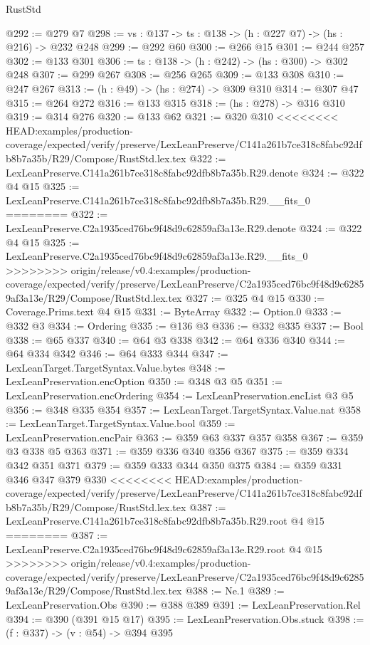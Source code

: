 \begin{lexlean}{RustStd}
\begin{coremodule}
{\begin{coremodule}
@292 := @279 @7
@298 := {vs : @137} -> {ts : @138} -> (h : @227 @7) -> (hs : @216) -> @232 @248
@299 := @292 @60
@300 := @266 @15
@301 := @244 @257
@302 := @133 @301
@306 := {ts : @138} -> (h : @242) -> (hs : @300) -> @302 @248
@307 := @299 @267
@308 := @256 @265
@309 := @133 @308
@310 := @247 @267
@313 := (h : @49) -> (hs : @274) -> @309 @310
@314 := @307 @47
@315 := @264 @272
@316 := @133 @315
@318 := (hs : @278) -> @316 @310
@319 := @314 @276
@320 := @133 @62
@321 := @320 @310
<<<<<<<< HEAD:examples/production-coverage/expected/verify/preserve/LexLeanPreserve/C141a261b7ce318c8fabc92dfb8b7a35b/R29/Compose/RustStd.lex.tex
@322 := LexLeanPreserve.C141a261b7ce318c8fabc92dfb8b7a35b.R29.denote
@324 := @322 @4 @15
@325 := LexLeanPreserve.C141a261b7ce318c8fabc92dfb8b7a35b.R29.__fits_0
========
@322 := LexLeanPreserve.C2a1935ced76bc9f48d9c62859af3a13e.R29.denote
@324 := @322 @4 @15
@325 := LexLeanPreserve.C2a1935ced76bc9f48d9c62859af3a13e.R29.__fits_0
>>>>>>>> origin/release/v0.4:examples/production-coverage/expected/verify/preserve/LexLeanPreserve/C2a1935ced76bc9f48d9c62859af3a13e/R29/Compose/RustStd.lex.tex
@327 := @325 @4 @15
@330 := Coverage.Prims.text @4 @15
@331 := ByteArray
@332 := Option.{0}
@333 := @332 @3
@334 := Ordering
@335 := @136 @3
@336 := @332 @335
@337 := Bool
@338 := @65 @337
@340 := @64 @3 @338
@342 := @64 @336 @340
@344 := @64 @334 @342
@346 := @64 @333 @344
@347 := LexLeanTarget.TargetSyntax.Value.bytes
@348 := LexLeanPreservation.encOption
@350 := @348 @3 @5
@351 := LexLeanPreservation.encOrdering
@354 := LexLeanPreservation.encList @3 @5
@356 := @348 @335 @354
@357 := LexLeanTarget.TargetSyntax.Value.nat
@358 := LexLeanTarget.TargetSyntax.Value.bool
@359 := LexLeanPreservation.encPair
@363 := @359 @63 @337 @357 @358
@367 := @359 @3 @338 @5 @363
@371 := @359 @336 @340 @356 @367
@375 := @359 @334 @342 @351 @371
@379 := @359 @333 @344 @350 @375
@384 := @359 @331 @346 @347 @379 @330
<<<<<<<< HEAD:examples/production-coverage/expected/verify/preserve/LexLeanPreserve/C141a261b7ce318c8fabc92dfb8b7a35b/R29/Compose/RustStd.lex.tex
@387 := LexLeanPreserve.C141a261b7ce318c8fabc92dfb8b7a35b.R29.root @4 @15
========
@387 := LexLeanPreserve.C2a1935ced76bc9f48d9c62859af3a13e.R29.root @4 @15
>>>>>>>> origin/release/v0.4:examples/production-coverage/expected/verify/preserve/LexLeanPreserve/C2a1935ced76bc9f48d9c62859af3a13e/R29/Compose/RustStd.lex.tex
@388 := Ne.{1}
@389 := LexLeanPreservation.Obs
@390 := @388 @389
@391 := LexLeanPreservation.Rel
@394 := @390 (@391 @15 @17)
@395 := LexLeanPreservation.Obs.stuck
@398 := (f : @337) -> (v : @54) -> @394 @395

\end{coremodule}}
\end{coremodule}
\end{lexlean}
